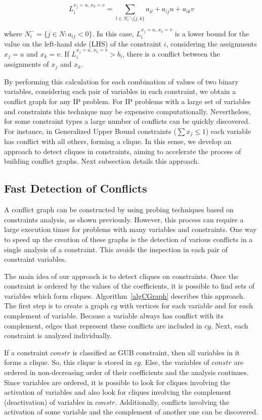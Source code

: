 \documentclass[preprint,12pt]{elsarticle}
\begin{document}
\begin{equation}\label{li}
L_{i}^{x_j = u,\, x_k = v}=\sum_{l\in N_{i}^{-} \setminus \{j, k\}}a_{il}+a_{ij}u+a_{ik}v 
\end{equation}

\noindent where $N_{i}^{-} = \{j \in N : a_{ij} < 0\}$. In this case, $L_{i}^{x_j = u,\, x_k = v}$ is a lower bound for the value on the left-hand side (LHS)  of the constraint $i$, considering the assignments $x_j = u$ and $x_k = v$. If $L_{i}^{x_j = u,\, x_k = v} > b_{i}$, there is a conflict between the assignments of $x_j$ and $x_k$. 

By performing this calculation for each combination of values of two binary variables, considering each pair of variables in each constraint, we obtain a conflict graph for any IP problem. For IP problems with a large set of variables and constraints this technique may be expensive computationally. Nevertheless, for some constraint types a large number of conflicts can be quickly discovered. For instance, in Generalized Upper Bound constraints ($\sum x_j \leq 1$) each variable has conflict with all others, forming a clique. In this sense, we develop an approach to detect cliques in constraints, aiming to accelerate the process of building conflict graphs. Next subsection details this approach.

\subsection{Fast Detection of Conflicts}
A conflict graph can be constructed by using probing techniques based on constraints analysis, as shown previously. However, this process can require a large execution times for problems with many variables and constraints. One way to speed up the creation of these graphs is the detection of various conflicts in a single analysis of a constraint. This avoids the inspection in each pair of constraint variables.

The main idea of our approach is to detect cliques on constraints. Once the constraint is ordered by the values of the coefficients, it is possible to find sets of variables which form cliques. Algorithm~\ref{algCGraph} describes this approach. The first step is to create a graph $cg$ with vertices for each variable and for each complement of variable. Because a variable always has conflict with its complement, edges that represent these conflicts are included in $cg$. Next, each constraint is analyzed individually.

If a constraint $constr$ is classified as GUB constraint, then all variables in it forms a clique. So, this clique is stored in $cg$. Else, the variables of $constr$ are ordered in non-decreasing order of their coefficients and the analysis continues. Since variables are ordered, it is possible to look for cliques involving the activation of variables and also look for cliques involving the complement (deactivation) of variables in $constr$. Additionally, conflicts involving the activation of some variable and the complement of another one can be discovered.
\end{document}
